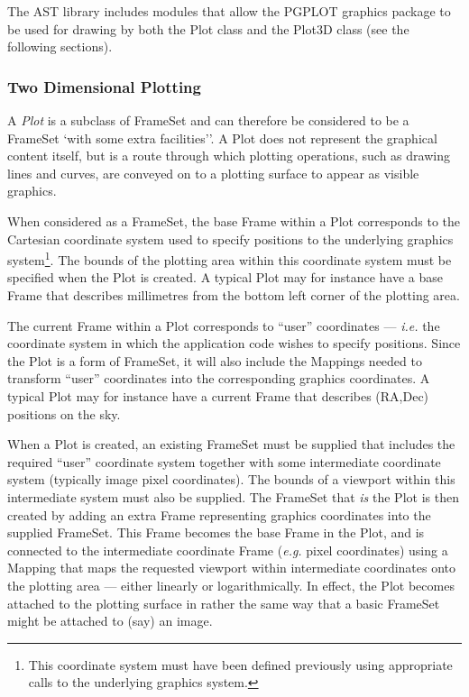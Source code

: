 \documentclass[final,authoryear,5p,times,twocolumn]{elsarticle}
\begin{document}
The AST library includes modules that allow the PGPLOT graphics package to
be used for drawing by both the Plot class and the Plot3D class (see the
following sections).

\subsubsection{Two Dimensional Plotting}
A \emph{Plot} is a subclass of FrameSet and can therefore be considered
to be a FrameSet `with some extra facilities''. A Plot does not represent
the graphical content itself, but is a route through which plotting
operations, such as drawing lines and curves, are conveyed on to a
plotting surface to appear as visible graphics.

When considered as a FrameSet, the base Frame within a Plot corresponds
to the Cartesian coordinate system used to specify positions to the
underlying graphics system\footnote{This coordinate system must have been
defined previously using appropriate calls to the underlying graphics
system.}. The bounds of the plotting area within this coordinate system must
be specified when the Plot is created. A typical Plot may for instance
have a base Frame that describes millimetres from the bottom left corner
of the plotting area.

The current Frame within a Plot corresponds to ``user''  coordinates ---
\emph{i.e.} the coordinate system in which the application code wishes to
specify positions. Since the Plot is a form of FrameSet, it will also
include the Mappings needed to transform ``user'' coordinates into the
corresponding graphics coordinates. A typical Plot may for instance
have a current Frame that describes (RA,Dec) positions on the sky.

When a Plot is created, an existing FrameSet must be supplied that
includes the required ``user'' coordinate system together with some
intermediate coordinate system (typically image pixel coordinates). The
bounds of a viewport within this intermediate system must also be
supplied. The FrameSet that \emph{is} the Plot is then created by adding
an extra Frame representing graphics coordinates into the supplied
FrameSet. This Frame becomes the base Frame in the Plot, and is connected
to the intermediate coordinate Frame (\emph{e.g.} pixel coordinates)
using a Mapping that maps the requested viewport within intermediate
coordinates onto the plotting area --- either linearly or
logarithmically. In effect, the Plot becomes attached to the plotting
surface in rather the same way that a basic FrameSet might be attached
to (say) an image.
\end{document}

